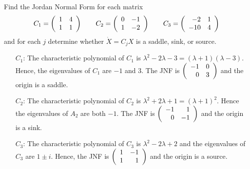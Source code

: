 \documentclass{ximera}
\author{Matthew Carr}
\begin{document}

\begin{exercise}\label{mc11_3A}

Find the Jordan Normal Form for each matrix 
\[
C_1 = \left(\begin{array}{rrrrrrrrrrrrrrrrrr}  1 & 4 \\ 1 & 1 \end{array}\right) \qquad C_2 = \left(\begin{array}{rrrrrrrrrrrrrrrrrr}  0 & -1 \\ 1 & -2  \end{array}\right) \qquad C_3 = \left(\begin{array}{rrrrrrrrrrrrrrrrrr}  -2 & 1 \\ -10 & 4 \end{array}\right)
\]
and for each $j$ determine whether $\dot{X} = C_jX$ is a saddle, sink, or source.
  
\begin{solution}


\soln 
\begin{itemize}
\item[$C_1$:] The characteristic polynomial of $C_1$ is $\lambda^2 -2\lambda -3 = (\lambda+1)(\lambda-3)$.  Hence, the eigenvalues of $C_1$ are $-1$ and $3$.  The JNF is $\left(\begin{array}{rrrrrrrrrrrrrrrrrr} -1 & 0 \\ 0 & 3 \end{array}\right)$ and the origin is a saddle.

\item[$C_2$:] The characteristic polynomial of $C_2$ is $\lambda^2 +2\lambda+ 1 = (\lambda+1)^2$.  Hence the eigenvalues of $A_2$ are both $-1$.  The JNF is $\left(\begin{array}{rrrrrrrrrrrrrrrrrr} -1 & 1 \\ 0 & -1 \end{array}\right)$ and the origin is a sink.

\item[$C_3$:] The characteristic polynomial of $C_3$ is $\lambda^2 - 2\lambda + 2$ and the eigenvalues of $C_3$ are $1 \pm i$.  Hence, the JNF is $\left(\begin{array}{rrrrrrrrrrrrrrrrrr} 1 & -1 \\ 1 & 1 \end{array}\right)$ and the origin is a source.
\end{itemize}

\end{solution}
\end{exercise}
\end{document}
